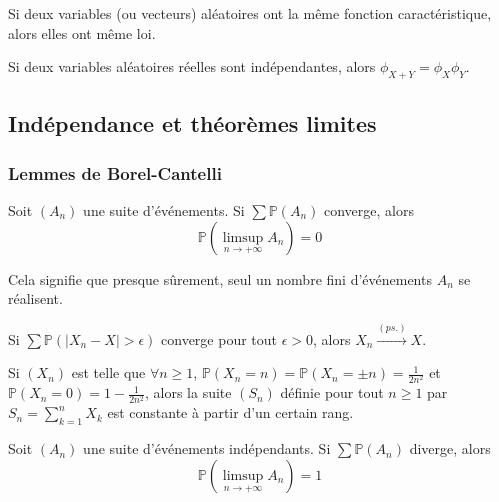   \begin{theorem}
    Si deux variables (ou vecteurs) aléatoires ont la même fonction caractéristique, alors elles ont même loi.
  \end{theorem}

  \begin{proposition}
    Si deux variables aléatoires réelles sont indépendantes, alors $\phi_{X+Y} = \phi_X \phi_Y$.
  \end{proposition}

  \subsection{Indépendance et théorèmes limites}

  \subsubsection{Lemmes de Borel-Cantelli}


  \begin{theorem}
    Soit $(A_n)$ une suite d'événements. Si $\sum \mathbb{P}(A_n)$ converge, alors
    \[ \mathbb{P} \left( \limsup_{n \rightarrow +\infty} A_n \right) = 0 \]
  \end{theorem}

  \begin{remark}
    Cela signifie que presque sûrement, seul un nombre fini d'événements $A_n$ se réalisent.
  \end{remark}

  \begin{corollary}
    Si $\sum \mathbb{P}(\vert X_n - X \vert > \epsilon)$ converge pour tout $\epsilon > 0$, alors $X_n \overset{(ps.)}{\longrightarrow} X$.
  \end{corollary}


  \begin{example}
    Si $(X_n)$ est telle que $\forall n \geq 1$, $\mathbb{P}(X_n = n) = \mathbb{P}(X_n = \pm n) = \frac{1}{2n^2}$ et $\mathbb{P}(X_n = 0) = 1 - \frac{1}{2n^2}$, alors la suite $(S_n)$ définie pour tout $n \geq 1$ par $S_n = \sum_{k=1}^n X_k$ est constante à partir d'un certain rang.
  \end{example}


  \begin{theorem}
    Soit $(A_n)$ une suite d'événements indépendants. Si $\sum \mathbb{P}(A_n)$ diverge, alors
    \[ \mathbb{P} \left( \limsup_{n \rightarrow +\infty} A_n \right) = 1 \]
  \end{theorem}

